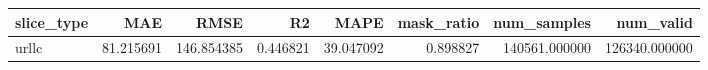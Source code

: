\begin{tabular}{lrrrrrrr}
\toprule
slice_type & MAE & RMSE & R2 & MAPE & mask_ratio & num_samples & num_valid \\
\midrule
urllc & 81.215691 & 146.854385 & 0.446821 & 39.047092 & 0.898827 & 140561.000000 & 126340.000000 \\
\bottomrule
\end{tabular}
